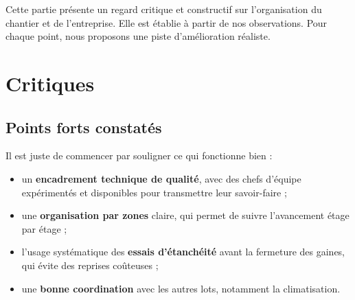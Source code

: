 

Cette partie présente un regard critique et constructif sur l'organisation du chantier et de
l'entreprise. Elle est établie à partir de nos observations. Pour chaque point, nous
proposons une piste d'amélioration réaliste.

\section{Critiques}

\subsection{Points forts constatés}
Il est juste de commencer par souligner ce qui fonctionne bien :
\begin{itemize}
  \item un \textbf{encadrement technique de qualité}, avec des chefs d'équipe expérimentés et
        disponibles pour transmettre leur savoir-faire ;
  \item une \textbf{organisation par zones} claire, qui permet de suivre l'avancement étage
        par étage ;
  \item l'usage systématique des \textbf{essais d'étanchéité} avant la fermeture des gaines,
        qui évite des reprises coûteuses ;
  \item une \textbf{bonne coordination} avec les autres lots, notamment la climatisation.
\end{itemize}

